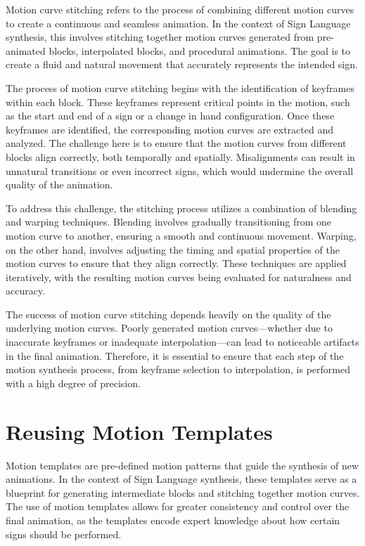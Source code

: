 \documentclass[../../main.tex]{subfiles}
\begin{document}
Motion curve stitching refers to the process of combining different motion curves to create a continuous and seamless animation. In the context of Sign Language synthesis, this involves stitching together motion curves generated from pre-animated blocks, interpolated blocks, and procedural animations. The goal is to create a fluid and natural movement that accurately represents the intended sign.

The process of motion curve stitching begins with the identification of keyframes within each block. These keyframes represent critical points in the motion, such as the start and end of a sign or a change in hand configuration. Once these keyframes are identified, the corresponding motion curves are extracted and analyzed. The challenge here is to ensure that the motion curves from different blocks align correctly, both temporally and spatially. Misalignments can result in unnatural transitions or even incorrect signs, which would undermine the overall quality of the animation.

To address this challenge, the stitching process utilizes a combination of blending and warping techniques. Blending involves gradually transitioning from one motion curve to another, ensuring a smooth and continuous movement. Warping, on the other hand, involves adjusting the timing and spatial properties of the motion curves to ensure that they align correctly. These techniques are applied iteratively, with the resulting motion curves being evaluated for naturalness and accuracy.

The success of motion curve stitching depends heavily on the quality of the underlying motion curves. Poorly generated motion curves—whether due to inaccurate keyframes or inadequate interpolation—can lead to noticeable artifacts in the final animation. Therefore, it is essential to ensure that each step of the motion synthesis process, from keyframe selection to interpolation, is performed with a high degree of precision.

\section{Reusing Motion Templates}
\label{ch:intermediate_blocks:reusing_motion_templates}

Motion templates are pre-defined motion patterns that guide the synthesis of new animations. In the context of Sign Language synthesis, these templates serve as a blueprint for generating intermediate blocks and stitching together motion curves. The use of motion templates allows for greater consistency and control over the final animation, as the templates encode expert knowledge about how certain signs should be performed.
\end{document}
